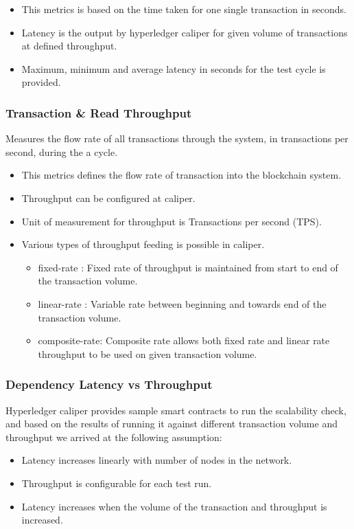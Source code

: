 \documentclass{ceadar_article}
\begin{document}
\begin{itemize}
    \item This metrics is based on the time taken for one single transaction in seconds.
    \item Latency is the output by hyperledger caliper for given volume of transactions at defined throughput.
    \item Maximum, minimum and average latency in seconds for the test cycle is provided.
\end{itemize}

\subsubsection{Transaction \& Read Throughput} 
Measures the flow rate of all transactions through the system, in transactions per second, during the a cycle. 
\begin{itemize}
    \item This metrics defines the flow rate of transaction into the blockchain system.
    \item Throughput can be configured at caliper.
    \item Unit of measurement for throughput is Transactions per second (TPS).
    \item Various types of throughput feeding is possible in caliper.
    \begin{itemize}
       \item fixed-rate : Fixed rate of throughput is maintained from start to end of the transaction volume.
       \item linear-rate : Variable rate between beginning and towards end of the transaction volume.
       \item composite-rate: Composite rate allows both fixed rate and linear rate throughput to be used on given transaction volume.
     \end{itemize}
   
\end{itemize}

\subsubsection{Dependency Latency vs Throughput}
Hyperledger caliper provides sample smart contracts to run the scalability check, and based on the results of running it against different transaction volume and throughput we arrived at the following assumption:

\begin{itemize}
    \item Latency increases linearly with number of nodes in the network.
    \item Throughput is configurable for each test run.
    \item Latency increases when the volume of the transaction and throughput is increased. 
\end{itemize}
\end{document}
